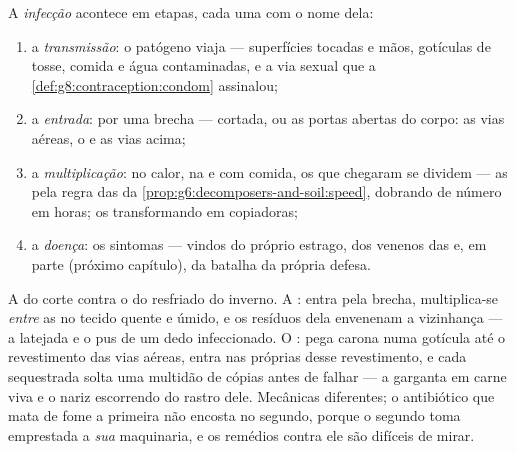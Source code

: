 \begin{definition}\label{def:g9:microbes-and-infection:stages}
A \emph{infecção} acontece em etapas, cada
uma com o nome dela:
\begin{enumerate}
  \item a \emph{transmissão}: o patógeno viaja ---
        superfícies tocadas e mãos, gotículas de tosse,
        comida e água contaminadas,  e a via sexual que
        a \cref{def:g8:contraception:condom} assinalou;
  \item a \emph{entrada}: por uma brecha ---  cortada, ou
        as portas abertas do corpo: as vias aéreas, o  e as vias acima;
  \item a \emph{multiplicação}: no calor, na  e com
        comida, os que chegaram se dividem --- as 
        pela regra das  da
        \cref{prop:g6:decomposers-and-soil:speed}, dobrando
        de número em horas; os  transformando  em
        copiadoras;
  \item a \emph{doença}: os sintomas --- vindos do próprio
        estrago, dos venenos das  e, em parte
        (próximo capítulo), da batalha da própria defesa.
\end{enumerate}
\end{definition}

\begin{example}\label{ex:g9:microbes-and-infection:contrast}
A  do corte contra o  do resfriado do inverno. A
: entra pela brecha, multiplica-se \emph{entre} as
 no tecido quente e úmido, e os resíduos dela
envenenam a vizinhança --- a latejada e o pus de um dedo
infeccionado. O : pega carona numa gotícula até o
revestimento das vias aéreas, entra nas próprias 
desse revestimento, e cada  sequestrada solta uma
multidão de cópias antes de falhar --- a garganta em carne
viva e o nariz escorrendo do rastro dele. Mecânicas
diferentes; o antibiótico que mata de fome a primeira não
encosta no segundo, porque o segundo toma emprestada a
\emph{sua} maquinaria, e os remédios contra ele são difíceis
de mirar.
\end{example}


